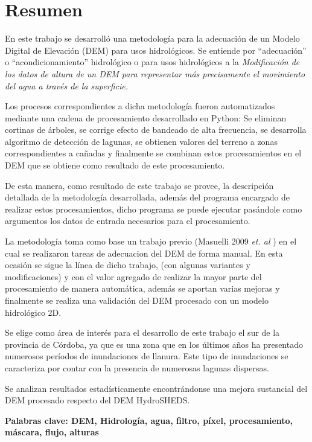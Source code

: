 \chapter*{Resumen}
\label{chap:resumen}


En este trabajo se desarrolló una metodología para la adecuación de un Modelo Digital de Elevación (DEM) para usos hidrológicos. Se entiende por "`adecuación"' o "`acondicionamiento"' hidrológico o para usos hidrológicos a la \textit{Modificación de los datos de altura de un DEM para representar más precisamente el movimiento del agua a través de la superficie.}

Los procesos correspondientes a dicha metodología fueron automatizados mediante una cadena de procesamiento desarrollado en Python: Se eliminan cortinas de árboles, se corrige efecto de bandeado de alta frecuencia, se desarrolla algoritmo de detección de lagunas, se obtienen valores del terreno a zonas correspondientes a cañadas y finalmente se combinan estos procesamientos en el DEM que se obtiene como resultado de este procesamiento.

De esta manera, como resultado de este trabajo se provee, la descripción detallada de la metodología desarrollada, además del programa encargado de realizar estos procesamientos, dicho programa se puede ejecutar pasándole como argumentos los datos de entrada necesarios para el procesamiento.

La metodología toma como base un trabajo previo (Masuelli 2009 \textit{et. al} \cite{Masuelli2009}) en el cual se realizaron tareas de adecuacion del DEM de forma manual. En esta ocasión se sigue la línea de dicho trabajo, (con algunas variantes y modificaciones) y con el valor agregado de realizar la mayor parte del procesamiento de manera automática, además se aportan varias mejoras y finalmente se realiza una validación del DEM procesado con un modelo hidrológico 2D.

Se elige como área de interés para el desarrollo de este trabajo el sur de la provincia de Córdoba, ya que es una zona que en los últimos años ha presentado numerosos períodos de inundaciones de llanura. Este tipo de inundaciones se caracteriza por contar con la presencia de numerosas lagunas dispersas.

Se analizan resultados estadísticamente encontrándonse una mejora sustancial del DEM procesado respecto del DEM HydroSHEDS.


\textbf{Palabras clave: DEM, Hidrología, agua, filtro, píxel, procesamiento, máscara, flujo, alturas}